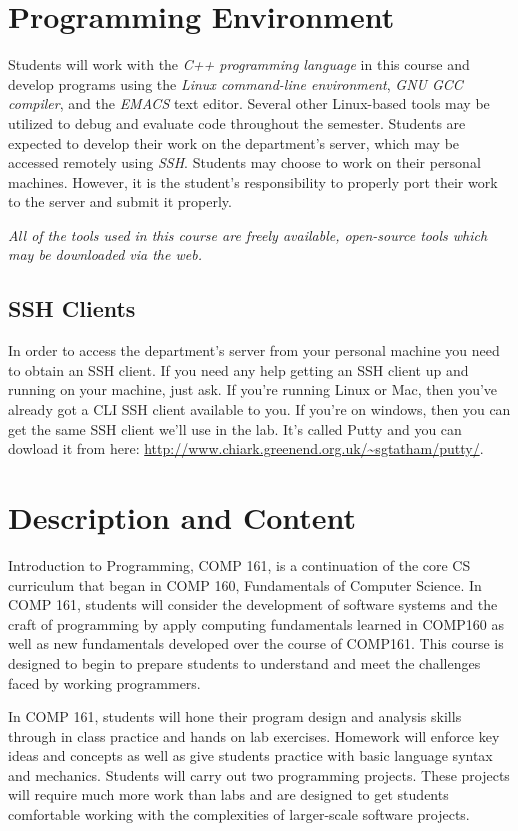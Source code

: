 \documentclass[10pt]{article}
\begin{document}
\section{Programming Environment}

Students will work with the \textit{C++ programming language} in this course and develop programs using the \textit{Linux command-line environment}, \textit{GNU GCC compiler}, and the \textit{EMACS} text editor.  Several other Linux-based tools may be utilized to debug and evaluate code throughout the semester. Students are expected to develop their work on the department's server, which may be accessed remotely using \textit{SSH}.  Students may choose to  work on their personal machines. However, it is the student's responsibility to properly port their work to the server and submit it properly.

\textit{All of the tools used in this course are freely available, open-source tools which may be downloaded via the web.}


\subsection{SSH Clients}

In order to access the department's server from your personal machine you need to obtain an SSH client. If you need any help getting an SSH client up and running on your machine, just ask.  If you're running Linux or Mac, then you've already got a CLI SSH client available to you.  If you're on windows, then you can get the same SSH client we'll use in the lab.  It's called Putty and you can dowload it from here: \url{http://www.chiark.greenend.org.uk/~sgtatham/putty/}.


\section{Description and Content}

Introduction to Programming, COMP 161, is a continuation of the core CS curriculum that began in COMP 160, Fundamentals of Computer Science.  In COMP 161, students will consider the development of software systems and the craft of programming by apply computing fundamentals learned in COMP160 as well as new fundamentals developed over the course of COMP161. This course is designed to begin to prepare students to understand and meet the challenges faced by working programmers.

In COMP 161, students will hone their program design and analysis skills through in class practice and hands on lab exercises.  Homework will enforce key ideas and concepts as well as give students practice with basic language syntax and mechanics.  Students will carry out two programming projects.  These projects will require much more work than labs and are designed to get students comfortable working with the complexities of larger-scale software projects.
\end{document}
